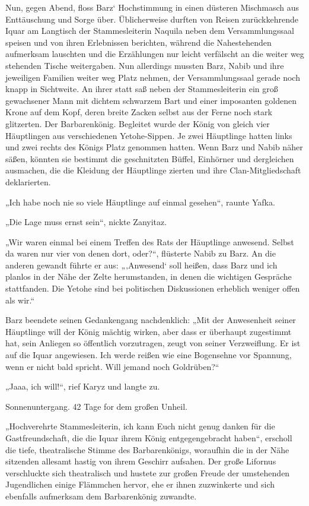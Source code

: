 Nun, gegen Abend, floss Barz‘ Hochstimmung in einen düsteren Mischmasch aus Enttäuschung und Sorge über. Üblicherweise durften von Reisen zurückkehrende Iquar am Langtisch der Stammesleiterin Naquila neben dem Versammlungssaal speisen und von ihren Erlebnissen berichten, während die Nahestehenden aufmerksam lauschten und die Erzählungen nur leicht verfälscht an die weiter weg stehenden Tische weitergaben. Nun allerdings mussten Barz, Nabib und ihre jeweiligen Familien weiter weg Platz nehmen, der Versammlungssaal gerade noch knapp in Sichtweite. An ihrer statt saß neben der Stammesleiterin ein groß gewachsener Mann mit dichtem schwarzem Bart und einer imposanten goldenen Krone auf dem Kopf, deren breite Zacken selbst aus der Ferne noch stark glitzerten. Der Barbarenkönig. Begleitet wurde der König von gleich vier Häuptlingen aus verschiedenen Yetohe-Sippen. Je zwei Häuptlinge hatten links und zwei rechts des Königs Platz genommen hatten. Wenn Barz und Nabib näher säßen, könnten sie bestimmt die geschnitzten Büffel, Einhörner und dergleichen ausmachen, die die Kleidung der Häuptlinge zierten und ihre Clan-Mitgliedschaft deklarierten.

„Ich habe noch nie so viele Häuptlinge auf einmal gesehen“, raunte Yafka.

„Die Lage muss ernst sein“, nickte Zanyitaz.

„Wir waren einmal bei einem Treffen des Rats der Häuptlinge anwesend. Selbst da waren nur vier von denen dort, oder?“, flüsterte Nabib zu Barz. An die anderen gewandt führte er aus: „‚Anwesend‘ soll heißen, dass Barz und ich planlos in der Nähe der Zelte herumstanden, in denen die wichtigen Gespräche stattfanden. Die Yetohe sind bei politischen Diskussionen erheblich weniger offen als wir.“

Barz beendete seinen Gedankengang nachdenklich: „Mit der Anwesenheit seiner Häuptlinge will der König mächtig wirken, aber dass er überhaupt zugestimmt hat, sein Anliegen so öffentlich vorzutragen, zeugt von seiner Verzweiflung. Er ist auf die Iquar angewiesen. Ich werde reißen wie eine Bogensehne vor Spannung, wenn er nicht bald spricht. Will jemand noch Goldrüben?“

„Jaaa, ich will!“, rief Karyz und langte zu.\bigskip







Sonnenuntergang. 42 Tage for dem großen Unheil.\bigskip



„Hochverehrte Stammesleiterin, ich kann Euch nicht genug danken für die Gastfreundschaft, die die Iquar ihrem König entgegengebracht haben“, erscholl die tiefe, theatralische Stimme des Barbarenkönigs, woraufhin die in der Nähe sitzenden allesamt hastig von ihrem Geschirr aufsahen. Der große Lifornus verschluckte sich theatralisch und hustete zur großen Freude der umstehenden Jugendlichen einige Flämmchen hervor, ehe er ihnen zuzwinkerte und sich ebenfalls aufmerksam dem Barbarenkönig zuwandte.

